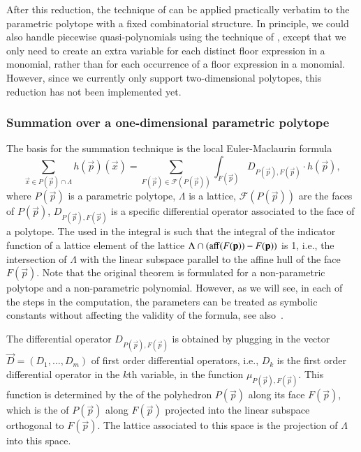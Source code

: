 After this reduction, the technique of
 can be applied practically verbatim
to the parametric polytope with a fixed combinatorial structure.
In principle, we could also handle piecewise quasi-polynomials
using the technique of ,
except that we only need to create an extra variable for each
distinct floor expression in a monomial, rather than for each
occurrence of a floor expression in a monomial.
However, since we currently only support two-dimensional polytopes,
this reduction has not been implemented yet.

\subsubsection{Summation over a one-dimensional parametric polytope}

The basis for the summation technique is the local
Euler-Maclaurin formula~\cite[Theorem~26]{Berline2006local}
\begin{equation}
\label{eq:EML}
\sum_{\vec x \in P(\vec p) \cap \Lambda} h(\vec p)(\vec x)
= \sum_{F(\vec p) \in {\mathcal F}(P(\vec p))}
	    \int_{F(\vec p)} D_{P(\vec p),F(\vec p)} \cdot h(\vec p)
,
\end{equation}
where $P(\vec p)$ is a parametric polytope,
$\Lambda$ is a lattice, ${\mathcal F}(P(\vec p))$
are the faces of $P(\vec p)$, $D_{P(\vec p),F(\vec p)}$ is a
specific differential operator associated to the face of a polytope.
The  used in the integral is such that the
integral of the indicator function of a lattice element of
the lattice $\Lambda \cap (\affhull(F(\vec p)) - F(\vec p))$ is 1,
i.e., the intersection of $\Lambda$ with the linear subspace
parallel to the affine hull of the face $F(\vec p)$.
Note that the original theorem is formulated for a non-parametric
polytope and a non-parametric polynomial.  However, as we will see,
in each of the steps in the computation, the parameters can be
treated as symbolic constants without affecting the validity of the formula,
see also~.

The differential operator $D_{P(\vec p),F(\vec p)}$ is obtained
by plugging in the vector $\vec D=(D_1,\ldots,D_m)$ of first
order differential operators, i.e., $D_k$ is the first order
differential operator in the $k$th variable,
in the function $\mu_{P(\vec p),F(\vec p)}$.
This function is determined by the 
of the polyhedron $P(\vec p)$ along its face $F(\vec p)$,
which is the  of $P(\vec p)$ along $F(\vec p)$
projected into the linear subspace orthogonal to $F(\vec p)$.
The lattice associated to this space is the projection of
$\Lambda$ into this space.

